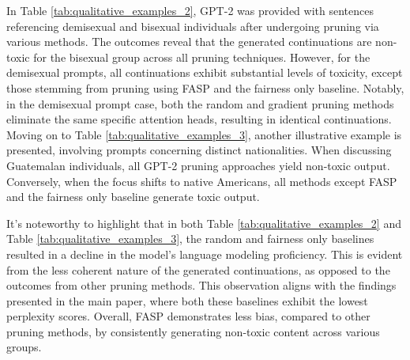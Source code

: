 \documentclass[letterpaper]{article} %
\begin{document}
In Table \ref{tab:qualitative_examples_2}, GPT-2 was provided with sentences referencing demisexual and bisexual individuals after undergoing pruning via various methods. The outcomes reveal that the generated continuations are non-toxic for the bisexual group across all pruning techniques. However, for the demisexual prompts, all continuations exhibit substantial levels of toxicity, except those stemming from pruning using FASP and the fairness only baseline. Notably, in the demisexual prompt case, both the random and gradient pruning methods eliminate the same specific attention heads, resulting in identical continuations. Moving on to Table \ref{tab:qualitative_examples_3}, another illustrative example is presented, involving prompts concerning distinct nationalities. When discussing Guatemalan individuals, all GPT-2 pruning approaches yield non-toxic output. Conversely, when the focus shifts to native Americans, all methods except FASP and the fairness only baseline generate toxic output.

It's noteworthy to highlight that in both Table \ref{tab:qualitative_examples_2} and Table \ref{tab:qualitative_examples_3}, the random and fairness only baselines resulted in a decline in the model's language modeling proficiency. This is evident from the less coherent nature of the generated continuations, as opposed to the outcomes from other pruning methods. This observation aligns with the findings presented in the main paper, where both these baselines exhibit the lowest perplexity scores. Overall, FASP demonstrates less bias, compared to other pruning methods, by consistently generating non-toxic content across various groups.
\end{document}
